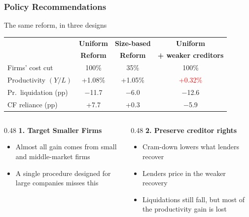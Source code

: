 \documentclass[aspectratio=169,xcolor=table]{beamer}
\begin{document}


\begin{frame}[label=rec] \frametitle{Policy Recommendations \hfill \hyperlink{sbra_full}{}}

The same reform, in three designs

\vspace{2mm}
\footnotesize
\centering
\renewcommand{\arraystretch}{0.9}
\begin{tabular}{lccc}
\toprule
 & \textbf{Uniform} & \textbf{Size-based} & \textbf{Uniform} \\
 & \textbf{Reform} & \textbf{Reform} & \textbf{+ weaker creditors} \\
\midrule
Firms' cost cut & 100\% & 35\% & 100\% \\
\midrule
Productivity $(Y/L)$ & \textcolor{primary}{+1.08\%} & \textcolor{primary}{+1.05\%} & \textcolor{red}{+0.32\%} \\
Pr.\ liquidation (pp) & $-$11.7 & $-$6.0 & $-$12.6 \\
CF reliance (pp)     & +7.7   & +0.3   & $-$5.9 \\
\bottomrule
\end{tabular}
\normalsize
\vspace{8mm}

\begin{columns}[T,onlytextwidth]
\begin{column}{0.48\textwidth}
\textbf{1. Target Smaller Firms}
\begin{itemize} \small
    \item Almost all gain comes from small and middle-market firms
    \item A single procedure designed for large companies misses this
\end{itemize}
\end{column}
\begin{column}{0.48\textwidth}
\textbf{2. Preserve creditor rights}
\begin{itemize} \small
    \item Cram-down lowers what lenders recover
    \item Lenders price in the weaker recovery
    \item Liquidations still fall, but most of the productivity gain is lost
\end{itemize}
\end{column}
\end{columns}

\end{frame}
\end{document}
